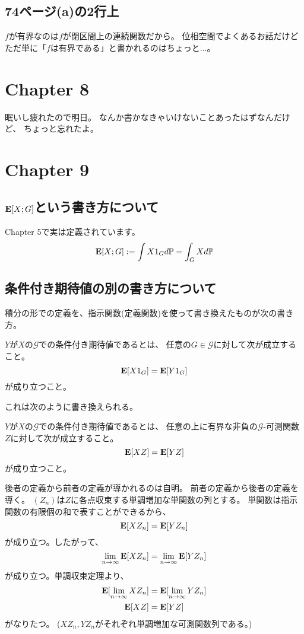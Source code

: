     \subsection{74ページ(a)の2行上}
      $f$が有界なのは$f$が閉区間上の連続関数だから。
      位相空間でよくあるお話だけどただ単に「$f$は有界である」と書かれるのはちょっと...。

  \section{Chapter 8}
    眠いし疲れたので明日。
    なんか書かなきゃいけないことあったはずなんだけど、
    ちょっと忘れたよ。

  \section{Chapter 9}
    \subsection{${\mathbf{E}}[X;G]$という書き方について}
      Chapter 5で実は定義されています。
      \[
        {\mathbf{E}}[X;G] := \int X 1_G d{\mathbb{P}} = \int_G X d{\mathbb{P}}
      \]

    \subsection{条件付き期待値の別の書き方について}
      積分の形での定義を、指示関数(定義関数)を使って書き換えたものが次の書き方。
      \begin{defn}
        $Y$が$X$の$\mathcal{G}$での条件付き期待値であるとは、
        任意の$G \in \mathcal{G}$に対して次が成立すること。
        \[
          {\mathbf{E}}[X1_G ] = {\mathbf{E}}[Y1_G]
        \]
        が成り立つこと。
      \end{defn}
      これは次のように書き換えられる。
      \begin{defn}
        $Y$が$X$の$\mathcal{G}$での条件付き期待値であるとは、
        任意の上に有界な非負の$\mathcal{G}$-可測関数$Z$に対して次が成立すること。
        \[
          {\mathbf{E}}[XZ] = {\mathbf{E}}[YZ]
        \]
        が成り立つこと。
      \end{defn}

      後者の定義から前者の定義が導かれるのは自明。
      前者の定義から後者の定義を導く。
      $(Z_n)$は$Z$に各点収束する単調増加な単関数の列とする。
      単関数は指示関数の有限個の和で表すことができるから、
      \[
        {\mathbf{E}}[XZ_n] = {\mathbf{E}}[YZ_n]
      \]
      が成り立つ。したがって、
      \[
        \lim_{n \to \infty} {\mathbf{E}}[XZ_n] = \lim_{n \to \infty} {\mathbf{E}}[YZ_n]
      \]
      が成り立つ。単調収束定理より、
      \begin{align*}
        {\mathbf{E}}[\lim_{n \to \infty} XZ_n] &= {\mathbf{E}}[\lim_{n \to \infty} YZ_n] \\
        {\mathbf{E}}[XZ] &= {\mathbf{E}}[YZ]
      \end{align*}
      がなりたつ。
      ($XZ_n,YZ_n$がそれぞれ単調増加な可測関数列である。)

